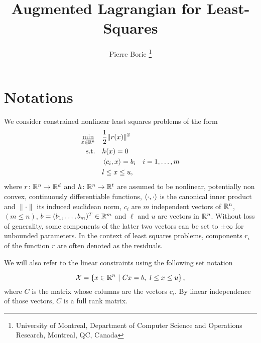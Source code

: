 \documentclass[10pt]{article}
\newcommand{\footremember}[2]{%
	\footnote{#2}
	\newcounter{#1}
	\setcounter{#1}{\value{footnote}}%
}
\begin{document}
	
	
	\title{Augmented Lagrangian for Least-Squares} %
	\author{Pierre Borie\footremember{1}{University of Montreal, Department of Computer Science and Operations Research, Montreal, QC, Canada}}
	\date{}
	
	
	
	\maketitle
	
	\section*{Notations}
	We consider constrained nonlinear least squares problems of the form
	\begin{equation}
		\label{eq:model_cnls}
		\begin{aligned}
			\min_{x\in {\mathbb{R}}^n} \quad & \dfrac{1}{2} \|r(x)\|^2 \\
			\text{s.t.} \quad & h(x) = 0 \\
			& \left\langle {c_i} , {x} \right\rangle = b_i\quad i=1,\ldots,m \\
			& l \le x \le u,
		\end{aligned}
	\end{equation}
	where $r\colon {\mathbb{R}}^n \to {\mathbb{R}}^d$  and $h\colon {\mathbb{R}}^n \to {\mathbb{R}}^t$ are assumed to be nonlinear, potentially non convex, continuously differentiable functions, $\left\langle {\cdot} , {\cdot} \right\rangle$ is the canonical inner product and $\|\cdot\| $  its induced euclidean norm, $c_i$ are $m$  independent vectors of ${\mathbb{R}}^n$, $( m \le n)$, $b=(b_1,\ldots,b_m)^T \in {\mathbb{R}}^m$ and $\ell$ and $u$ are vectors in ${\mathbb{R}}^n$. Without loss of generality, some components of the latter two vectors can be set to $\pm \infty$ for unbounded parameters. In the context of least squares problems, components $r_i$ of the function $r$ are often denoted as the residuals.
	
	We will also refer to the linear constraints using the following set notation 
	
	\begin{equation}
		\label{eq:linear_constraints}
		{\mathcal{X}} = \left\{ x \in {\mathbb{R}}^n \ | \ Cx=b,\ l \le x \le u\right\},
	\end{equation}
	where $C$ is the matrix whose columns are the vectors $c_i$. By linear independence of those vectors, $C$ is a full rank matrix.
	
\end{document}
